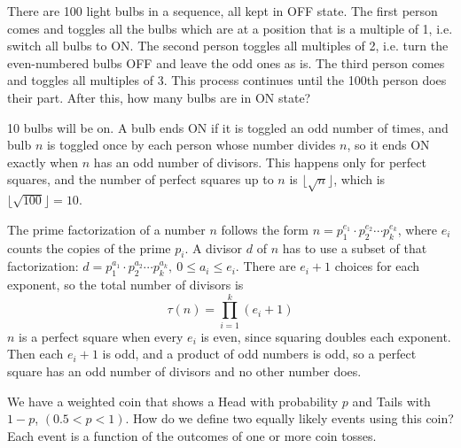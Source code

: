 \vspace{-1ex}

\begin{problem}
\vspace{-1ex}

There are 100 light bulbs in a sequence, all kept in OFF state. The first person comes and toggles all the bulbs which are at a position that is a multiple of 1, i.e. switch all bulbs to ON. The second person toggles all multiples of 2, i.e. turn the even-numbered bulbs OFF and leave the odd ones as is. The third person comes and toggles all multiples of 3. This process continues until the 100th person does their part. After this, how many bulbs are in ON state?
\end{problem}

\begin{solution}
10 bulbs will be on. A bulb ends ON if it is toggled an odd number of times, and bulb $n$ is toggled once by each person whose number divides $n$, so it ends ON exactly when $n$ has an odd number of divisors. This happens only for perfect squares, and the number of perfect squares up to $n$ is $\lfloor \sqrt{n} \rfloor$, which is $\lfloor \sqrt{100} \rfloor = 10$.

The prime factorization of a number $n$ follows the form $n = p_1^{e_1} \cdot p_2^{e_2} \cdots p_k^{e_k}$, where $e_i$ counts the copies of the prime $p_i$. A divisor $d$ of $n$ has to use a subset of that factorization: $d = p_1^{a_1} \cdot p_2^{a_2} \cdots p_k^{a_k}, \ 0 \leq a_i \leq e_i$. There are $e_i + 1$ choices for each exponent, so the total number of divisors is
\[
\tau(n) = \prod_{i=1}^k (e_i + 1)
\]
$n$ is a perfect square when every $e_i$ is even, since squaring doubles each exponent. Then each $e_i + 1$ is odd, and a product of odd numbers is odd, so a perfect square has an odd number of divisors and no other number does.
\end{solution}

\vspace{-1ex}

\begin{problem}
\vspace{-1ex}

We have a weighted coin that shows a Head with probability $p$ and Tails with $1-p$, $(0.5 < p < 1)$. How do we define two equally likely events using this coin? Each event is a function of the outcomes of one or more coin tosses.
\end{problem}

